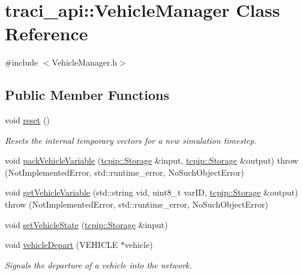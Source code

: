 \hypertarget{classtraci__api_1_1_vehicle_manager}{}\section{traci\+\_\+api\+:\+:Vehicle\+Manager Class Reference}
\label{classtraci__api_1_1_vehicle_manager}


{\ttfamily \#include $<$Vehicle\+Manager.\+h$>$}

\subsection*{Public Member Functions}
\begin{DoxyCompactItemize}
\item 
void \hyperlink{classtraci__api_1_1_vehicle_manager_abbf990fe432a286e4d3889ff3b3491df}{reset} ()
\begin{DoxyCompactList}\small\item\em Resets the internal temporary vectors for a new simulation timestep. \end{DoxyCompactList}\item 
void \hyperlink{classtraci__api_1_1_vehicle_manager_a4b246d7f01b5f37679830f677328fc16}{pack\+Vehicle\+Variable} (\hyperlink{classtcpip_1_1_storage}{tcpip\+::\+Storage} \&input, \hyperlink{classtcpip_1_1_storage}{tcpip\+::\+Storage} \&output)  throw (\+Not\+Implemented\+Error, std\+::runtime\+\_\+error, No\+Such\+Object\+Error)
\item 
void \hyperlink{classtraci__api_1_1_vehicle_manager_a6926963a4f6914be50a1b75833574249}{get\+Vehicle\+Variable} (std\+::string vid, uint8\+\_\+t var\+ID, \hyperlink{classtcpip_1_1_storage}{tcpip\+::\+Storage} \&output)  throw (\+Not\+Implemented\+Error, std\+::runtime\+\_\+error, No\+Such\+Object\+Error)
\item 
void \hyperlink{classtraci__api_1_1_vehicle_manager_a7b3c7300d7b091527ed296652701c471}{set\+Vehicle\+State} (\hyperlink{classtcpip_1_1_storage}{tcpip\+::\+Storage} \&input)
\item 
void \hyperlink{classtraci__api_1_1_vehicle_manager_a6451b873f33f8a6713df294a81b78d3f}{vehicle\+Depart} (V\+E\+H\+I\+C\+LE $\ast$vehicle)
\begin{DoxyCompactList}\small\item\em Signals the departure of a vehicle into the network. \end{DoxyCompactList}\item 

\end{DoxyCompactItemize}
